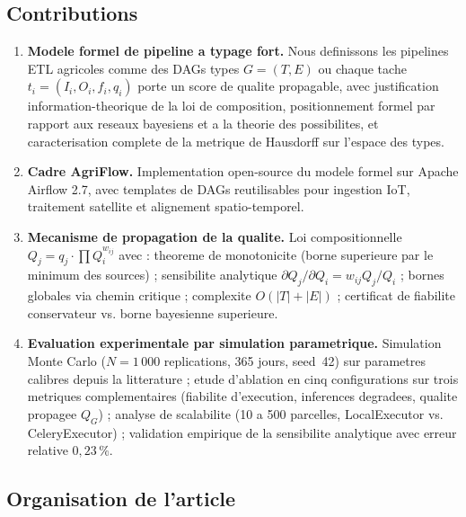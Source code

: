 \documentclass[12pt,a4paper]{article}
\theoremstyle{plain}
\theoremstyle{definition}
\theoremstyle{remark}
\begin{document}
	\subsection{Contributions}
	
	\begin{contribbox}
		\begin{enumerate}[leftmargin=1.2em,itemsep=4pt]
			\item \textbf{Modele formel de pipeline a typage fort.}
			Nous definissons les pipelines ETL agricoles comme des DAGs types
			$G=(T,E)$ ou chaque tache $t_i=(I_i,O_i,f_i,q_i)$ porte un score
			de qualite propagable, avec justification information-theorique de la
			loi de composition, positionnement formel par rapport aux reseaux
			bayesiens et a la theorie des possibilites, et caracterisation
			complete de la metrique de Hausdorff sur l'espace des types.
			
			\item \textbf{Cadre AgriFlow.}
			Implementation open-source du modele formel sur Apache Airflow 2.7,
			avec templates de DAGs reutilisables pour ingestion IoT,
			traitement satellite et alignement spatio-temporel.
			
			\item \textbf{Mecanisme de propagation de la qualite.}
			Loi compositionnelle $Q_j = q_j \cdot \prod Q_i^{w_{ij}}$ avec :
			theoreme de monotonicite (borne superieure par le minimum des sources) ;
			sensibilite analytique $\partial Q_j/\partial Q_i = w_{ij} Q_j/Q_i$ ;
			bornes globales via chemin critique ; complexite $O(|T|+|E|)$ ;
			certificat de fiabilite conservateur vs. borne bayesienne superieure.
			
			\item \textbf{Evaluation experimentale par simulation paramet\-rique.}
			Simulation Monte Carlo ($N=1\,000$ replications, 365 jours, seed~42)
			sur parametres calibres depuis la litterature ; etude d'ablation en
			cinq configurations sur trois metriques complementaires (fiabilite
			d'execution, inferences degradees, qualite propagee $Q_G$) ;
			analyse de scalabilite (10 a 500 parcelles, LocalExecutor vs.
			CeleryExecutor) ; validation empirique de la sensibilite analytique
			avec erreur relative $0{,}23\,\%$.
		\end{enumerate}
	\end{contribbox}
	
	\subsection{Organisation de l'article}
	
\end{document}
